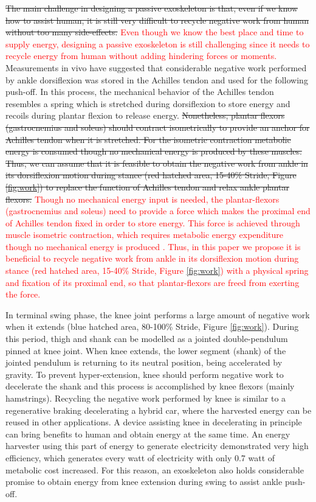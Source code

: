 \documentclass[twocolumn,cleanfoot,10pt]{asme2ej}
\begin{document}
\sout{The main challenge in designing a passive exoskeleton is that, even if we know how to assist human, it is still very difficult to recycle negative work from human without too many side-effects.} \textcolor{red}{Even though we know the best place and time to supply energy, designing a passive exoskeleton is still challenging since it needs to recycle energy from human without adding hindering forces or moments.} Measurements in vivo have suggested that considerable negative work performed by ankle dorsiflexion was stored in the Achilles tendon and used for the following push-off\cite{RN16}. In this process, the mechanical behavior of the Achilles tendon resembles a spring which is stretched during dorsiflexion to store energy and recoils during plantar flexion to release energy. \sout{Nonetheless, plantar flexors (gastrocnemius and soleus) should contract isometrically to provide an anchor for Achilles tendon when it is stretched. For the isometric contraction metabolic energy is consumed though no mechanical energy is produced by these muscles\cite{RN17}. Thus, we can assume that it is feasible to obtain the negative work from ankle in its dorsiflexion motion during stance (red hatched area, 15-40\% Stride, Figure \ref{fig:work}) to replace the function of Achilles tendon and relax ankle plantar flexors.} \textcolor{red}{Though no mechanical energy input is needed, the plantar-flexors (gastrocnemius and soleus) need to provide a force which makes the proximal end of Achilles tendon fixed in order to store energy. This force is achieved through muscle isometric contraction, which requires metabolic energy expenditure though no mechanical energy is produced \cite{RN17}. Thus, in this paper we propose it is beneficial to recycle negative work from ankle in its dorsiflexion motion during stance (red hatched area, 15-40\% Stride, Figure \ref{fig:work}) with a physical spring and fixation of its proximal end, so that plantar-flexors are freed from exerting the force.}

In terminal swing phase, the knee joint performs a large amount of negative work when it extends (blue hatched area, 80-100\% Stride, Figure \ref{fig:work}). During this period, thigh and shank can be modelled as a jointed double-pendulum pinned at knee joint\cite{RN2}. When knee extends, the lower segment (shank) of the jointed pendulum is returning to its neutral position, being accelerated by gravity. To prevent hyper-extension, knee should perform negative work to decelerate the shank and this process is accomplished by knee flexors (mainly hamstrings). Recycling the negative work performed by knee is similar to a regenerative braking decelerating a hybrid car, where the harvested energy can be reused in other applications. A device assisting knee in decelerating in principle can bring benefits to human and obtain energy at the same time. An energy harvester using this part of energy to generate electricity demonstrated very high efficiency, which generates every watt of electricity with only 0.7 watt of metabolic cost increased\cite{RN18}. For this reason, an exoskeleton also holds considerable promise to obtain energy from knee extension during swing to assist ankle push-off.
\end{document}
